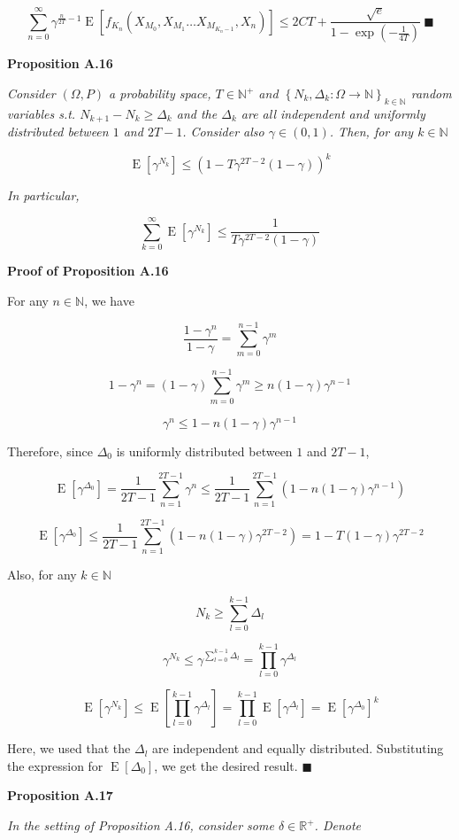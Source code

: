 \documentclass[a4paper]{article}
\newcommand{\Co}[1]{}
\newcommand{\AP}[1]{\left(#1\right)}
\newcommand{\AB}[1]{\left[#1\right]}
\newcommand{\AC}[1]{\left\{#1\right\}}
\newcommand{\E}[1]{\operatorname{E}\AB{#1}}
\newcommand{\Nats}{\mathbb{N}}
\newcommand{\Reals}{\mathbb{R}}
\begin{document}
$$\sum_{n=0}^\infty\gamma^{\frac{n}{2T}-1}\E{f_{K_n}\AP{X_{M_0},X_{M_1}\ldots X_{M_{K_n-1}},X_n}} \leq 2CT+\frac{\sqrt{e}}{1-\exp\AP{-\frac{1}{4T}}}\ \blacksquare$$

\textbf{Proposition A.16}\Co{b}

\textit{Consider $(\Omega,P)$ a probability space, $T\in\Nats^+$ and $\AC{N_k,\Delta_k:\Omega\rightarrow\Nats}_{k\in\Nats}$ random variables s.t. $N_{k+1}-N_k\geq\Delta_k$ and the $\Delta_k$ are all independent and uniformly distributed between $1$ and $2T-1$. Consider also $\gamma\in(0,1)$. Then, for any $k\in\Nats$}\Co{i}

$$\E{\gamma^{N_k}}\leq\AP{1-T\gamma^{2T-2}(1-\gamma)}^k$$

\textit{In particular,}\Co{i}

$$\sum_{k=0}^\infty\E{\gamma^{N_k}}\leq\frac{1}{T\gamma^{2T-2}(1-\gamma)}$$

\textbf{Proof of Proposition A.16}\Co{b}

For any $n\in\Nats$, we have

$$\frac{1-\gamma^n}{1-\gamma}=\sum_{m=0}^{n-1}\gamma^m$$

$$1-\gamma^n=(1-\gamma)\sum_{m=0}^{n-1}\gamma^m\geq n(1-\gamma)\gamma^{n-1}$$

$$\gamma^n\leq1-n(1-\gamma)\gamma^{n-1}$$

Therefore, since $\Delta_0$ is uniformly distributed between $1$ and $2T-1$,

$$\E{\gamma^{\Delta_0}}=\frac{1}{2T-1}\sum_{n=1}^{2T-1}\gamma^n\leq\frac{1}{2T-1}\sum_{n=1}^{2T-1}\AP{1-n(1-\gamma)\gamma^{n-1}}$$

$$\E{\gamma^{\Delta_0}}\leq\frac{1}{2T-1}\sum_{n=1}^{2T-1}\AP{1-n(1-\gamma)\gamma^{2T-2}}=1-T(1-\gamma)\gamma^{2T-2}$$

Also, for any $k\in\Nats$

$$N_k\geq\sum_{l=0}^{k-1}\Delta_l$$

$$\gamma^{N_k}\leq\gamma^{\sum_{l=0}^{k-1}\Delta_l}=\prod_{l=0}^{k-1}\gamma^{\Delta_l}$$

$$\E{\gamma^{N_k}}\leq\E{\prod_{l=0}^{k-1}\gamma^{\Delta_l}}=\prod_{l=0}^{k-1}\E{\gamma^{\Delta_l}}=\E{\gamma^{\Delta_0}}^k$$

Here, we used that the $\Delta_l$ are independent and equally distributed. Substituting the expression for $\E{\Delta_0}$, we get the desired result. $\blacksquare$

\textbf{Proposition A.17}\Co{b}

\textit{In the setting of Proposition A.16, consider some $\delta\in\Reals^+$. Denote}\Co{i}
\end{document}
